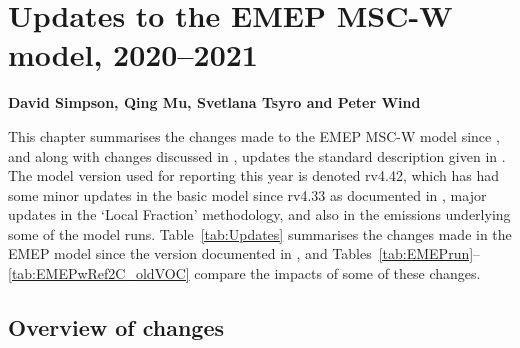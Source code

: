 \chapter[Model updates]{Updates to the EMEP MSC-W model, 2020--2021}
\label{ch:ModelUpdates}


{\bf{David Simpson, Qing Mu, Svetlana Tsyro and Peter Wind}}
\vspace{30pt}


This chapter summarises the changes made to the EMEP MSC-W  model
since \citet{R2020:ModDev}, and along with changes discussed in
\citet{R2013:ModDev,R2014:ModDev,R2015:ModDev,R2016:ModDev,R2017:ModDev,R2019:ModDev,R2020:ModDev},
updates the standard description given in \citet{Simpson_et_al:EMEP}. The
model version used for reporting this year is denoted rv4.42, which has
had some minor updates in the basic model since rv4.33 as documented
in  \citet{R2019:ModDev}, major updates in the `Local Fraction'
methodology, and also in the emissions underlying some of the model runs. Table~\ref{tab:Updates} summarises
the changes made in the EMEP model since the version documented in
\citet{Simpson_et_al:EMEP}, and Tables~\ref{tab:EMEPrun}--\ref{tab:EMEPwRef2C_oldVOC} compare the impacts of some of these changes.

%

\section{Overview of changes} 

